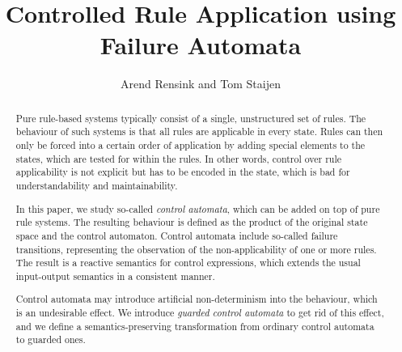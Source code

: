\title{Controlled Rule Application using Failure Automata}
\author{Arend Rensink and Tom Staijen}


\maketitle

\begin{abstract}
  Pure rule-based systems typically consist of a single, unstructured set of
  rules.  The behaviour of such systems is that all rules are applicable in
  every state. Rules can then only be forced into a certain order of
  application by adding special elements to the states, which are tested for
  within the rules. In other words, control over rule applicability is not
  explicit but has to be encoded in the state, which is bad for
  understandability and maintainability.

  In this paper, we study so-called \emph{control automata}, which can be added
  on top of pure rule systems. The resulting behaviour is defined as the
  product of the original state space and the control automaton.  Control
  automata include so-called failure transitions, representing the observation
  of the non-applicability of one or more rules.  The result is a reactive
  semantics for control expressions, which extends the usual input-output
  semantics in a consistent manner.

  Control automata may introduce artificial non-determinism into the behaviour,
  which is an undesirable effect. We introduce \emph{guarded control automata}
  to get rid of this effect, and we define a semantics-preserving
  transformation from ordinary control automata to guarded ones.
\end{abstract}

